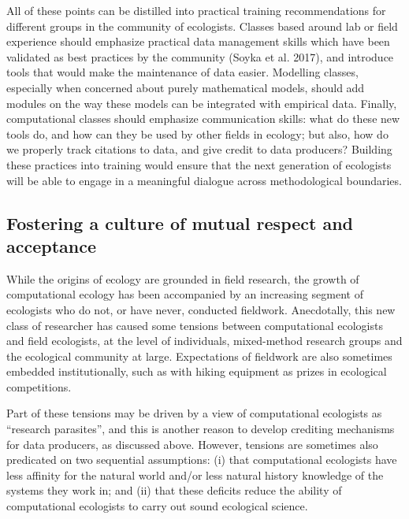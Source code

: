 \documentclass[12pt]{article}
\begin{document}
All of these points can be distilled into practical training
recommendations for different groups in the community of ecologists.
Classes based around lab or field experience should emphasize practical
data management skills which have been validated as best practices by
the community (Soyka et al. 2017), and introduce tools that would make
the maintenance of data easier. Modelling classes, especially when
concerned about purely mathematical models, should add modules on the
way these models can be integrated with empirical data. Finally,
computational classes should emphasize communication skills: what do
these new tools do, and how can they be used by other fields in ecology;
but also, how do we properly track citations to data, and give credit to
data producers? Building these practices into training would ensure that
the next generation of ecologists will be able to engage in a meaningful
dialogue across methodological boundaries.

\hypertarget{fostering-a-culture-of-mutual-respect-and-acceptance}{%
\subsection{Fostering a culture of mutual respect and
acceptance}\label{fostering-a-culture-of-mutual-respect-and-acceptance}}

While the origins of ecology are grounded in field research, the growth
of computational ecology has been accompanied by an increasing segment
of ecologists who do not, or have never, conducted fieldwork.
Anecdotally, this new class of researcher has caused some tensions
between computational ecologists and field ecologists, at the level of
individuals, mixed-method research groups and the ecological community
at large. Expectations of fieldwork are also sometimes embedded
institutionally, such as with hiking equipment as prizes in ecological
competitions.

Part of these tensions may be driven by a view of computational
ecologists as \enquote{research parasites}, and this is another reason
to develop crediting mechanisms for data producers, as discussed above.
However, tensions are sometimes also predicated on two sequential
assumptions: (i) that computational ecologists have less affinity for
the natural world and/or less natural history knowledge of the systems
they work in; and (ii) that these deficits reduce the ability of
computational ecologists to carry out sound ecological science.
\end{document}

